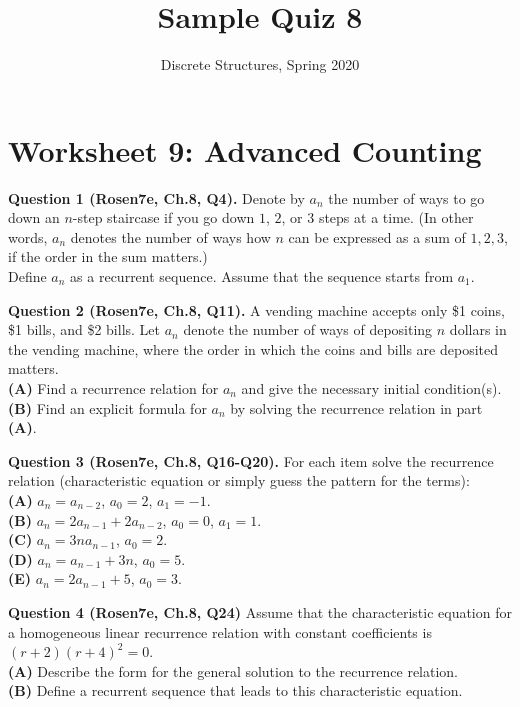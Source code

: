\documentclass[jou]{apa6}
\title{Sample Quiz 8}
\author{Discrete Structures, Spring 2020}
\affiliation{RBS}
\begin{document}

\twocolumn
\section{Worksheet 9: Advanced Counting}

\vspace{10pt}
{\bf Question 1 (Rosen7e, Ch.8, Q4).} 
Denote by $a_n$ the number of ways to go down an $n$-step staircase if you go down $1$, $2$, or $3$ steps at a time.
(In other words, $a_n$ denotes the number of ways how $n$ can be expressed as a sum of $1,2,3$, if the
order in the sum matters.)\\
Define $a_n$ as a recurrent sequence. Assume that the sequence starts from $a_1$. 

\vspace{10pt}
{\bf Question 2 (Rosen7e, Ch.8, Q11).}
A vending machine accepts only \$1 coins, \$1 bills, and \$2 bills. Let $a_n$ denote the
number of ways of depositing $n$ dollars in the vending machine, where the order in which the coins and bills
are deposited matters.\\
{\bf (A)} Find a recurrence relation for $a_n$ and give the necessary initial condition(s).\\
{\bf (B)} Find an explicit formula for $a_n$ by solving the recurrence relation in part {\bf (A)}.

\vspace{10pt}
{\bf Question 3 (Rosen7e, Ch.8, Q16-Q20).}
For each item solve the recurrence relation (characteristic equation 
or simply guess the pattern for the terms):\\
{\bf (A)} $a_n = a_{n-2}$, $a_0 = 2$, $a_1 = -1$.\\
{\bf (B)} $a_n = 2a_{n-1} + 2a_{n-2}$, $a_0 = 0$, $a_1 = 1$.\\
{\bf (C)} $a_n = 3na_{n-1}$, $a_0 = 2$.\\
{\bf (D)} $a_n = a_{n-1} + 3n$, $a_0 = 5$.\\
{\bf (E)} $a_n = 2a_{n-1} + 5$, $a_0 = 3$.

\vspace{10pt}
{\bf Question 4 (Rosen7e, Ch.8, Q24)}
Assume that the characteristic equation for a homogeneous 
linear recurrence relation with constant coefficients
is $(r + 2)(r + 4)^2 = 0$.\\
{\bf (A)} Describe the form for the general solution to the recurrence relation.\\
{\bf (B)} Define a recurrent sequence that leads to this characteristic equation.
\end{document}

